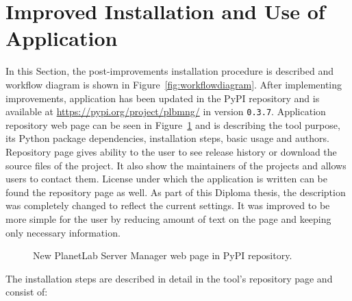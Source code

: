{{{{{{{\section{Improved Installation and Use of Application}
\label{section:currentapp}
In this Section, the post-improvements installation procedure is described and workflow diagram is shown in Figure~\ref{fig:workflowdiagram}. After implementing improvements, application has been updated in the PyPI repository and is available at \url{https://pypi.org/project/plbmng/} in version \texttt{0.3.7}. Application repository web page can be seen in Figure~\ref{fig:plbmngrepo} and is describing the tool purpose, its Python package dependencies, installation steps, basic usage and authors. Repository page gives ability to the user to see release history or download the source files of the project. It also show the maintainers of the projects and allows users to contact them. License under which the application is written can be found the repository page as well. As part of this Diploma thesis, the description was completely changed to reflect the current settings. It was improved to be more simple for the user by reducing amount of text on the page and keeping only necessary information.

\begin{figure}[H]
	\centering
	\caption{New PlanetLab Server Manager web page in PyPI repository.}
	\label{fig:plbmngrepo}
\end{figure}

The installation steps are described in detail in the tool's repository page and consist of:

}}}}}}}
